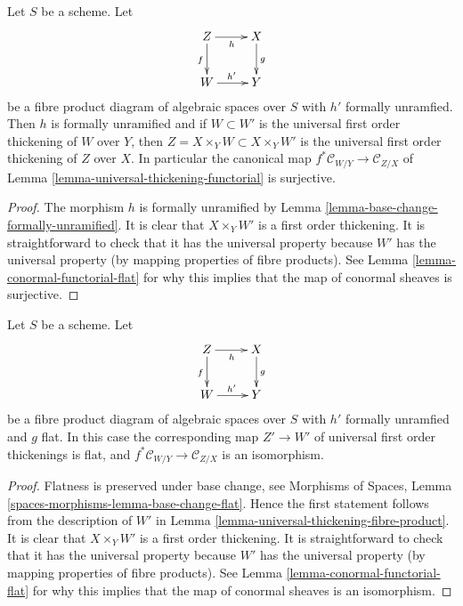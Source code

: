 \begin{lemma}
\label{lemma-universal-thickening-fibre-product}
Let $S$ be a scheme. Let
$$
\xymatrix{
Z \ar[r]_h \ar[d]_f & X \ar[d]^g \\
W \ar[r]^{h'} & Y
}
$$
be a fibre product diagram of algebraic spaces over $S$ with
$h'$ formally unramfied. Then $h$ is formally unramified and if
$W \subset W'$ is the universal first order thickening of $W$ over $Y$,
then $Z = X \times_Y W \subset X \times_Y W'$ is the universal
first order thickening of $Z$ over $X$. In particular the canonical map
$f^*\mathcal{C}_{W/Y} \to \mathcal{C}_{Z/X}$ of
Lemma \ref{lemma-universal-thickening-functorial}
is surjective.
\end{lemma}

\begin{proof}
The morphism $h$ is formally unramified by
Lemma \ref{lemma-base-change-formally-unramified}.
It is clear that $X \times_Y W'$ is a first order thickening.
It is straightforward to check that it has the universal property
because $W'$ has the universal property (by mapping properties of
fibre products). See
Lemma \ref{lemma-conormal-functorial-flat}
for why this implies that the map of conormal sheaves is surjective.
\end{proof}

\begin{lemma}
\label{lemma-universal-thickening-fibre-product-flat}
Let $S$ be a scheme. Let
$$
\xymatrix{
Z \ar[r]_h \ar[d]_f & X \ar[d]^g \\
W \ar[r]^{h'} & Y
}
$$
be a fibre product diagram of algebraic spaces over $S$ with
$h'$ formally unramfied and $g$ flat. In this case the corresponding
map $Z' \to W'$ of universal first order thickenings is flat, and
$f^*\mathcal{C}_{W/Y} \to \mathcal{C}_{Z/X}$ is an isomorphism.
\end{lemma}

\begin{proof}
Flatness is preserved under base change, see
Morphisms of Spaces, Lemma \ref{spaces-morphisms-lemma-base-change-flat}.
Hence the first statement follows from the description of $W'$ in
Lemma \ref{lemma-universal-thickening-fibre-product}.
It is clear that $X \times_Y W'$ is a first order thickening.
It is straightforward to check that it has the universal property
because $W'$ has the universal property (by mapping properties of
fibre products). See
Lemma \ref{lemma-conormal-functorial-flat}
for why this implies that the map of conormal sheaves is an isomorphism.
\end{proof}

